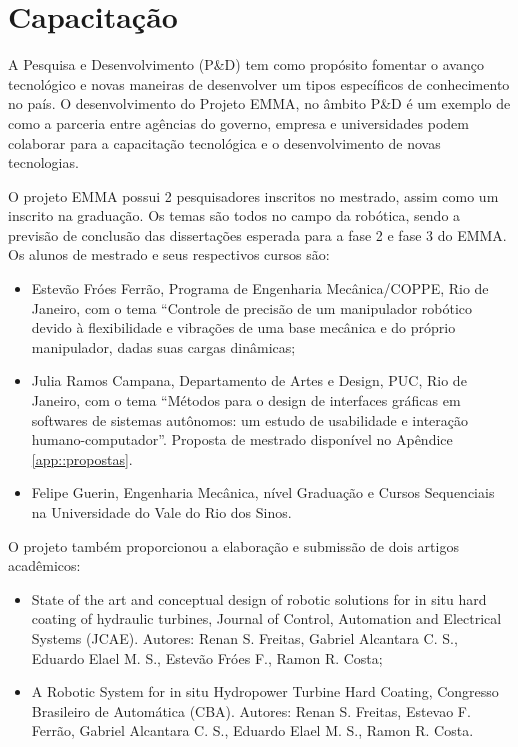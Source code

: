 \section{Capacitação}

A Pesquisa e Desenvolvimento (P\&D) tem como propósito fomentar o avanço
tecnológico e novas maneiras de desenvolver um tipos específicos de conhecimento
no país. O desenvolvimento do Projeto EMMA, no âmbito P\&D é um exemplo de como
a parceria entre agências do governo, empresa e universidades podem colaborar para
a capacitação tecnológica e o desenvolvimento de novas tecnologias.

O projeto EMMA possui 2 pesquisadores inscritos no mestrado, assim como um
inscrito na graduação.
Os temas são todos no campo da robótica, sendo a previsão de conclusão das dissertações
esperada para a fase 2 e fase 3 do EMMA. Os alunos de mestrado e seus
respectivos cursos são:

\begin{itemize}
  \item Estevão Fróes Ferrão, Programa de Engenharia Mecânica/COPPE, Rio de
  Janeiro, com o tema ``Controle de precisão de um manipulador robótico devido à
  flexibilidade e vibrações de uma base mecânica e do próprio manipulador, dadas
  suas cargas dinâmicas;
  \item Julia Ramos Campana, Departamento de Artes e Design, PUC, Rio de
  Janeiro, com o tema ``Métodos para o design de interfaces gráficas em
softwares de sistemas autônomos: um estudo de usabilidade e interação
humano-computador''. Proposta de mestrado disponível no Apêndice
\ref{app::propostas}.
 \item Felipe Guerin, Engenharia Mecânica, nível Graduação e Cursos Sequenciais
 na Universidade do Vale do Rio dos Sinos.
\end{itemize}
O projeto também proporcionou a elaboração e submissão de dois artigos
acadêmicos:

\begin{itemize}
  \item State of the art and conceptual design of robotic solutions for in situ
  hard coating of hydraulic turbines, Journal of Control, Automation and
  Electrical Systems (JCAE). Autores: Renan S. Freitas, Gabriel Alcantara C. S.,
  Eduardo Elael M. S., Estevão Fróes F., Ramon R. Costa;
  \item A Robotic System for in situ Hydropower Turbine Hard Coating, Congresso
  Brasileiro de Automática (CBA). Autores: Renan S. Freitas, Estevao F. Ferrão,
  Gabriel Alcantara C. S., Eduardo Elael M. S., Ramon R. Costa.
\end{itemize}


